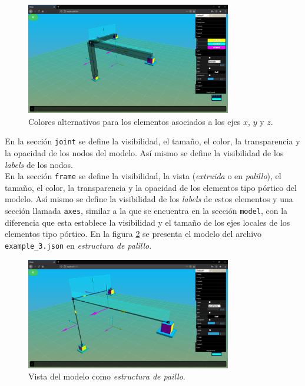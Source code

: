 \begin{figure}[ht]
  \centering
  \includegraphics[width=0.8\textwidth]{introduction/dat-gui-axes.png}
  \caption{Colores alternativos para los elementos asociados a los ejes $ x $, $ y $ y $ z $.}
  \label{fig:dat.gui-axes}
\end{figure}

En la sección \verb|joint| se define la visibilidad, el tamaño, el color, la transparencia y la opacidad de los nodos del modelo. Así mismo se define la visibilidad de los \emph{labels} de los nodos.\\

En la sección \verb|frame| se define la visibilidad, la vista (\emph{extruida} o en \emph{palillo}), el tamaño, el color, la transparencia y la opacidad de los elementos tipo pórtico del modelo. Así mismo se define la visibilidad de los \emph{labels} de estos elementos y una sección llamada \verb|axes|, similar a la que se encuentra en la sección \verb|model|, con la diferencia que esta establece la visibilidad y el tamaño de los ejes locales de los elementos tipo pórtico. En la figura \ref{fig:dat.gui-frame} se presenta el modelo del archivo \verb|example_3.json| en \emph{estructura de palillo}.\\

\begin{figure}[ht]
  \centering
  \includegraphics[width=0.8\textwidth]{introduction/dat-gui-frame.png}
  \caption{Vista del modelo como \emph{estructura de paillo}.}
  \label{fig:dat.gui-frame}
\end{figure}

